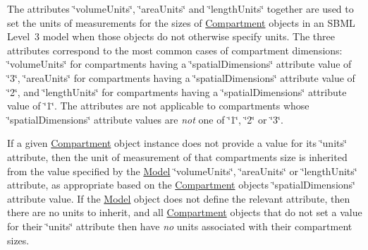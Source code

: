 The attributes \char`\"{}volume\+Units\char`\"{}, \char`\"{}area\+Units\char`\"{} and \char`\"{}length\+Units\char`\"{} together are used to set the units of measurements for the sizes of \hyperlink{class_compartment}{Compartment} objects in an S\+B\+ML Level~3 model when those objects do not otherwise specify units. The three attributes correspond to the most common cases of compartment dimensions\+: \char`\"{}volume\+Units\char`\"{} for compartments having a \char`\"{}spatial\+Dimensions\char`\"{} attribute value of {\ttfamily \char`\"{}3\char`\"{}}, \char`\"{}area\+Units\char`\"{} for compartments having a \char`\"{}spatial\+Dimensions\char`\"{} attribute value of {\ttfamily \char`\"{}2\char`\"{}}, and \char`\"{}length\+Units\char`\"{} for compartments having a \char`\"{}spatial\+Dimensions\char`\"{} attribute value of {\ttfamily \char`\"{}1\char`\"{}}. The attributes are not applicable to compartments whose \char`\"{}spatial\+Dimensions\char`\"{} attribute values are {\itshape not} one of {\ttfamily \char`\"{}1\char`\"{}}, {\ttfamily \char`\"{}2\char`\"{}} or {\ttfamily \char`\"{}3\char`\"{}}.

If a given \hyperlink{class_compartment}{Compartment} object instance does not provide a value for its \char`\"{}units\char`\"{} attribute, then the unit of measurement of that compartment\textquotesingle{}s size is inherited from the value specified by the \hyperlink{class_model}{Model} \char`\"{}volume\+Units\char`\"{}, \char`\"{}area\+Units\char`\"{} or \char`\"{}length\+Units\char`\"{} attribute, as appropriate based on the \hyperlink{class_compartment}{Compartment} object\textquotesingle{}s \char`\"{}spatial\+Dimensions\char`\"{} attribute value. If the \hyperlink{class_model}{Model} object does not define the relevant attribute, then there are no units to inherit, and all \hyperlink{class_compartment}{Compartment} objects that do not set a value for their \char`\"{}units\char`\"{} attribute then have {\itshape no} units associated with their compartment sizes.

